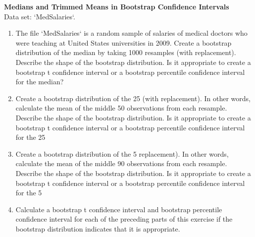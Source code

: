 \documentclass[
]{report}
\theoremstyle{definition}
\theoremstyle{definition}
\theoremstyle{definition}
\theoremstyle{definition}
\theoremstyle{remark}
\begin{document}
\begin{list}{E.}{ \setlength{\itemsep}{0.5em}}
  \item \textbf{Medians and Trimmed Means in Bootstrap Confidence Intervals} \\
  Data set: `MedSalaries`. 
  \begin{enumerate}
    \setcounter{enumi}{0}  
    \item The file `MedSalaries` is a random sample of salaries of medical doctors who were teaching
at United States universities in 2009. Create a bootstrap distribution of the median by taking
1000 resamples (with replacement). Describe the shape of the bootstrap distribution. Is it appropriate
to create a bootstrap t confidence interval or a bootstrap percentile confidence interval for
the median?
    \item Create a bootstrap distribution of the 25%
(with replacement). In other words, calculate the mean of the middle 50 observations from
each resample. Describe the shape of the bootstrap distribution. Is it appropriate to create a
bootstrap t confidence interval or a bootstrap percentile confidence interval for the
25%
    \item Create a bootstrap distribution of the 5%
replacement). In other words, calculate the mean of the middle 90 observations from each
resample. Describe the shape of the bootstrap distribution. Is it appropriate to create
a bootstrap t confidence interval or a bootstrap percentile confidence interval for the
5%
    \item Calculate a bootstrap t confidence interval and bootstrap percentile confidence interval for
each of the preceding parts of this exercise if the bootstrap distribution indicates that it is
appropriate.
  \end{enumerate}
  
  
  

\end{list}
\end{document}
